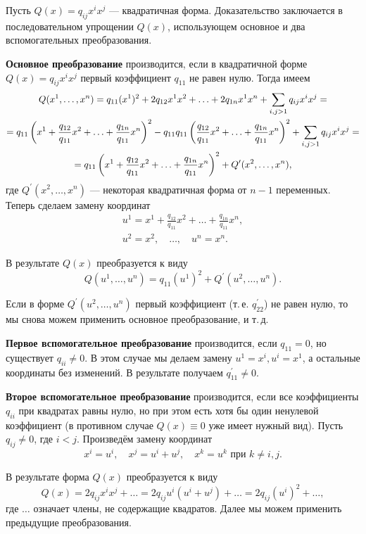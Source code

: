 \smallskip
{}
Пусть $Q(x) = q_{ij}x^ix^j$ --- квадратичная форма. Доказательство заключается в последовательном упрощении $Q(x)$, использующем основное и два вспомогательных преобразования.

\textbf{Основное преобразование} производится, если в квадратичной форме $Q(x) = q_{ij}x^ix^j$ первый коэффициент $q_{11}$ не равен нулю. Тогда имеем
\begin{multline*}
    Q(x^1, \ldots, x^n) = q_{11}(x^1)^2 + 2q_{12}x^1x^2 + \ldots + 2q_{1n}x^1x^n + \sum_{i, j > 1}q_{ij}x^ix^j =\\ =
    q_{11}\left(x^1 + \frac{q_{12}}{q_{11}}x^2 + \ldots + \frac{q_{1n}}{q_{11}}x^n\right)^2 - q_{11}q_{11}\left(\frac{q_{12}}{q_{11}}x^2 + \ldots + \frac{q_{1n}}{q_{11}}x^n\right)^2 + \sum_{i, j > 1}q_{ij}x^ix^j =\\ = q_{11}\left(x^1 + \frac{q_{12}}{q_{11}}x^2 + \ldots + \frac{q_{1n}}{q_{11}}x^n\right)^2 + Q^\prime(x^2, \ldots, x^n),
\end{multline*}
где $Q^\prime(x^2, \ldots, x^n)$ --- некоторая квадратичная форма от $n - 1$ переменных. Теперь сделаем замену координат
\begin{gather*}
    u^1 = x^1 + \frac{q_{12}}{q_{11}}x^2 + \ldots + \frac{q_{1n}}{q_{11}}x^n,\\
    u^2 = x^2,\quad \ldots,\quad u^n = x^n.
\end{gather*}

В результате $Q(x)$ преобразуется к виду
\[
    Q(u^1, \ldots, u^n) = q_{11}(u^1)^2 + Q^\prime(u^2, \ldots, u^n).
\]

Если в форме $Q^\prime(u^2, \ldots, u^n)$ первый коэффициент (т.\,е. $q^\prime_{22}$) не равен нулю, то мы снова можем применить основное преобразование, и т.\,д.

\textbf{Первое вспомогательное преобразование} производится, если $q_{11} = 0$, но существует $q_{ii} \ne 0$. В этом случае мы делаем замену $u^1 = x^i, u^i = x^1$, а остальные координаты без изменений. В результате получаем $q^\prime_{11} \ne 0$.

\textbf{Второе вспомогательное преобразование} производится, если все коэффициенты $q_{ii}$ при квадратах равны нулю, но при этом есть хотя бы один ненулевой коэффициент (в противном случае $Q(x) \equiv 0$ уже имеет нужный вид). Пусть $q_{ij} \ne 0$, где $i < j$. Произведём замену координат
\[
    x^i = u^i,\quad x^j = u^i + u^j,\quad x^k = u^k\text{ при $k \ne i, j$}.
\]

В результате форма $Q(x)$ преобразуется к виду
\[
    Q(x) = 2q_{ij}x^ix^j + \ldots = 2q_{ij}u^i(u^i + u^j) + \ldots = 2q_{ij}(u^i)^2 + \ldots,
\]
где $\ldots$ означает члены, не содержащие квадратов. Далее мы можем применить предыдущие преобразования.

